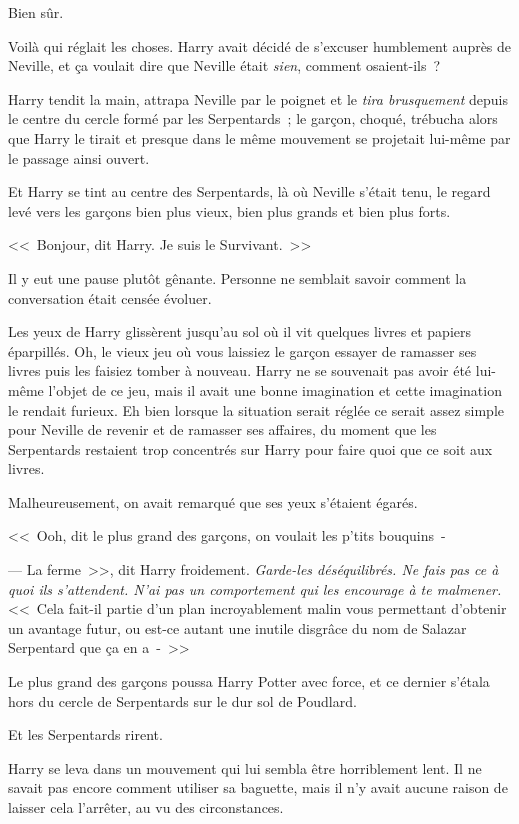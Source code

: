 Bien sûr.

Voilà qui réglait les choses. Harry avait décidé de s'excuser humblement auprès de Neville, et ça voulait dire que Neville était \emph{sien}, comment osaient-ils~?

Harry tendit la main, attrapa Neville par le poignet et le \emph{tira brusquement} depuis le centre du cercle formé par les Serpentards~; le garçon, choqué, trébucha alors que Harry le tirait et presque dans le même mouvement se projetait lui-même par le passage ainsi ouvert.

Et Harry se tint au centre des Serpentards, là où Neville s'était tenu, le regard levé vers les garçons bien plus vieux, bien plus grands et bien plus forts.

<<~Bonjour, dit Harry. Je suis le Survivant.~>>

Il y eut une pause plutôt gênante. Personne ne semblait savoir comment la conversation était censée évoluer.

Les yeux de Harry glissèrent jusqu'au sol où il vit quelques livres et papiers éparpillés. Oh, le vieux jeu où vous laissiez le garçon essayer de ramasser ses livres puis les faisiez tomber à nouveau. Harry ne se souvenait pas avoir été lui-même l'objet de ce jeu, mais il avait une bonne imagination et cette imagination le rendait furieux. Eh bien lorsque la situation serait réglée ce serait assez simple pour Neville de revenir et de ramasser ses affaires, du moment que les Serpentards restaient trop concentrés sur Harry pour faire quoi que ce soit aux livres.

Malheureusement, on avait remarqué que ses yeux s'étaient égarés.

<<~Ooh, dit le plus grand des garçons, on voulait les p'tits bouquins~-

--- La ferme~>>, dit Harry froidement. \emph{Garde-les déséquilibrés. Ne fais pas ce à quoi ils s'attendent. N'ai pas un comportement qui les encourage à te malmener.} <<~Cela fait-il partie d'un plan incroyablement malin vous permettant d'obtenir un avantage futur, ou est-ce autant une inutile disgrâce du nom de Salazar Serpentard que ça en a~-~>>

Le plus grand des garçons poussa Harry Potter avec force, et ce dernier s'étala hors du cercle de Serpentards sur le dur sol de Poudlard.

Et les Serpentards rirent.

Harry se leva dans un mouvement qui lui sembla être horriblement lent. Il ne savait pas encore comment utiliser sa baguette, mais il n'y avait aucune raison de laisser cela l'arrêter, au vu des circonstances.

